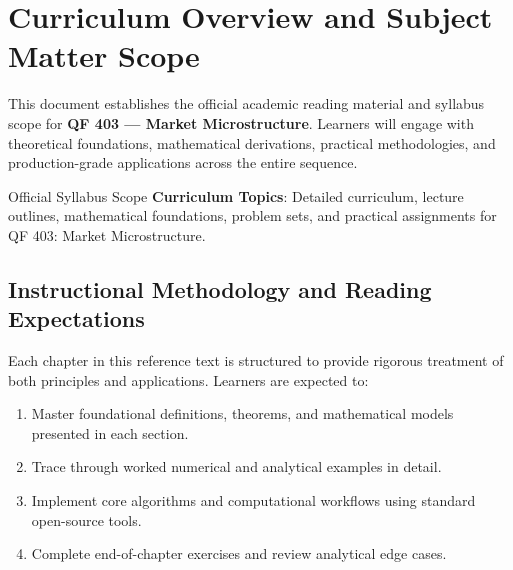 \section{Curriculum Overview and Subject Matter Scope}

This document establishes the official academic reading material and syllabus scope for \textbf{QF 403 --- Market Microstructure}. Learners will engage with theoretical foundations, mathematical derivations, practical methodologies, and production-grade applications across the entire sequence.

\begin{InsightBox}{Official Syllabus Scope}
  \textbf{Curriculum Topics}: Detailed curriculum, lecture outlines, mathematical foundations, problem sets, and practical assignments for QF 403: Market Microstructure.
\end{InsightBox}

\subsection{Instructional Methodology and Reading Expectations}

Each chapter in this reference text is structured to provide rigorous treatment of both principles and applications. Learners are expected to:
\begin{enumerate}
  \item Master foundational definitions, theorems, and mathematical models presented in each section.
  \item Trace through worked numerical and analytical examples in detail.
  \item Implement core algorithms and computational workflows using standard open-source tools.
  \item Complete end-of-chapter exercises and review analytical edge cases.
\end{enumerate}

